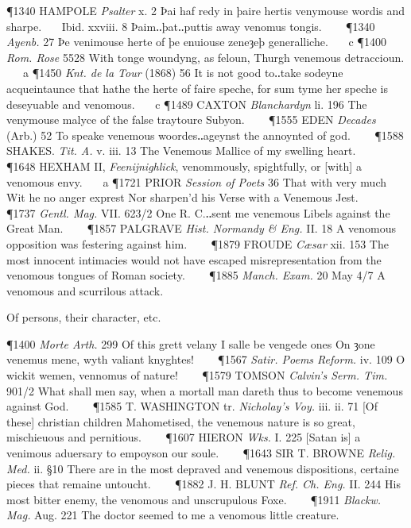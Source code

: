 \begin{description}[wide, labelwidth=!, labelindent=0pt]
\begin{myenumerate}
\P 1340 HAMPOLE  \textit{Psalter} x. 2 Þai haf redy in þaire hertis venymouse wordis and sharpe.    Ibid. xxviii. 8 Þaim‥þat‥puttis away venomus tongis.    
\P 1340  \textit{Ayenb.} 27 Þe venimouse herte of þe enuiouse zeneȝeþ generalliche.    c 
\P 1400  \textit{Rom. Rose} 5528 With tonge woundyng, as feloun, Thurgh venemous detraccioun.    a 
\P 1450  \textit{Knt. de la Tour} (1868) 56 It is not good to‥take sodeyne acqueintaunce that hathe the herte of faire speche, for sum tyme her speche is deseyuable and venomous.    c 
\P 1489 CAXTON  \textit{Blanchardyn} li. 196 The venymouse malyce of the false traytoure Subyon.    
\P 1555 EDEN  \textit{Decades} (Arb.) 52 To speake venemous woordes‥ageynst the annoynted of god.    
\P 1588 SHAKES.  \textit{Tit. A.} v. iii. 13 The Venemous Mallice of my swelling heart.    
\P 1648 HEXHAM II, \textit{Feenijnighlick}, venommously, spightfully, or [with] a venomous envy.    a 
\P 1721 PRIOR  \textit{Session of Poets} 36 That with very much Wit he no anger exprest Nor sharpen'd his Verse with a Venemous Jest.    
\P 1737  \textit{Gentl. Mag.} VII. 623/2 One R. C.‥sent me venemous Libels against the Great Man.    
\P 1857 PALGRAVE  \textit{Hist. Normandy \& Eng.} II. 18 A venomous opposition was festering against him.    
\P 1879 FROUDE  \textit{Cæsar} xii. 153 The most innocent intimacies would not have escaped misrepresentation from the venomous tongues of Roman society.    
\P 1885  \textit{Manch. Exam.} 20 May 4/7 A venomous and scurrilous attack.

 Of persons, their character, etc.

\P 1400  \textit{Morte Arth.} 299 Of this grett velany I salle be vengede ones On ȝone venemus mene, wyth valiant knyghtes!    
\P 1567 \textit{Satir.  Poems Reform.} iv. 109 O wickit wemen, vennomus of nature!    
\P 1579 TOMSON  \textit{Calvin's Serm. Tim.} 901/2 What shall men say, when a mortall man dareth thus to become venemous against God.    
\P 1585 T. WASHINGTON tr. \textit{Nicholay's Voy.} iii. ii. 71 [Of these] christian children Mahometised, the venemous nature is so great, mischieuous and pernitious.    
\P 1607 HIERON  \textit{Wks.} I. 225 [Satan is] a venimous aduersary to empoyson our soule.    
\P 1643 SIR T. BROWNE  \textit{Relig. Med.} ii. §10 There are in the most depraved and venemous dispositions, certaine pieces that remaine untoucht.    
\P 1882 J. H. BLUNT  \textit{Ref. Ch. Eng.} II. 244 His most bitter enemy, the venomous and unscrupulous Foxe.    
\P 1911  \textit{Blackw. Mag.} Aug. 221 The doctor seemed to me a venomous little creature.


\end{myenumerate}
\end{description}
